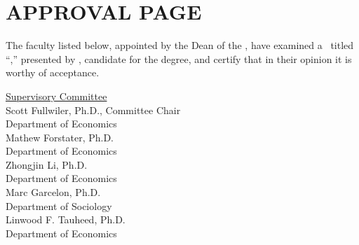 %
%


\section*{\MakeUppercase{Approval Page}}

\setlength{\baselineskip}{24pt}
The faculty listed below, appointed by the Dean of the \MyUMKCSchool,
 have examined a \MakeLowercase{\ThesisOrDissertation}\ titled
``\MyThesisTitle,''
presented by \MyName, candidate
for the \MyDegree degree, and  certify that in
their opinion it is worthy of acceptance.

\vspace{0.5in}
\setlength{\baselineskip}{5pt}

\begin{center}
\underline{Supervisory Committee}\\

\vspace{0.25in}
Scott Fullwiler, Ph.D., Committee Chair\\
Department of Economics\\

\vspace{0.25in}
Mathew Forstater, Ph.D.\\
Department of Economics\\

\vspace{0.25in}
Zhongjin Li, Ph.D.\\
Department of Economics\\

\vspace{0.25in}
Marc Garcelon, Ph.D.\\
Department of Sociology\\

\vspace{0.25in}
Linwood F. Tauheed, Ph.D.\\
Department of Economics\\

\end{center} \doublespacing \newpage